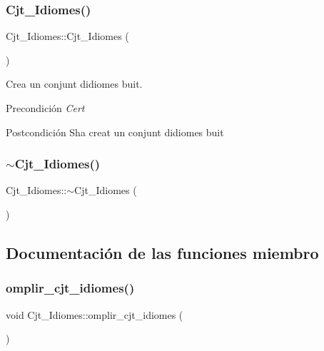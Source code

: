 \subsubsection{\texorpdfstring{Cjt\+\_\+\+Idiomes()}{Cjt\_Idiomes()}}
{\footnotesize\ttfamily Cjt\+\_\+\+Idiomes\+::\+Cjt\+\_\+\+Idiomes (\begin{DoxyParamCaption}{ }\end{DoxyParamCaption})}



Crea un conjunt d\textquotesingle{}idiomes buit. 

\begin{DoxyPrecond}{Precondición}
{\itshape Cert} 
\end{DoxyPrecond}
\begin{DoxyPostcond}{Postcondición}
S\textquotesingle{}ha creat un conjunt d\textquotesingle{}idiomes buit 
\end{DoxyPostcond}
\mbox{\label{class_cjt___idiomes_ab36517bd1824e0f00cab6cf724b6ad6f}} 
\subsubsection{\texorpdfstring{$\sim$\+Cjt\+\_\+\+Idiomes()}{~Cjt\_Idiomes()}}
{\footnotesize\ttfamily Cjt\+\_\+\+Idiomes\+::$\sim$\+Cjt\+\_\+\+Idiomes (\begin{DoxyParamCaption}{ }\end{DoxyParamCaption})}



\subsection{Documentación de las funciones miembro}
\mbox{\label{class_cjt___idiomes_a27ad0dd99449fffa904e6a757b4388ad}} 
\subsubsection{\texorpdfstring{omplir\+\_\+cjt\+\_\+idiomes()}{omplir\_cjt\_idiomes()}}
{\footnotesize\ttfamily void Cjt\+\_\+\+Idiomes\+::omplir\+\_\+cjt\+\_\+idiomes (\begin{DoxyParamCaption}{ }\end{DoxyParamCaption})}



